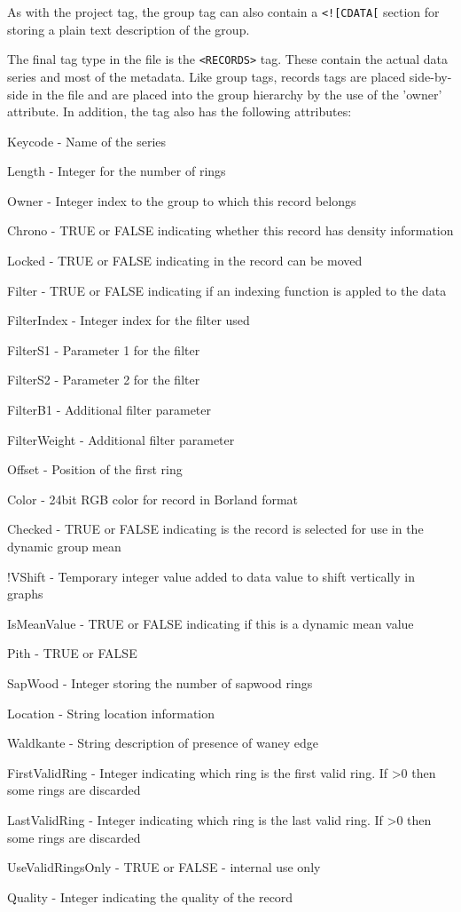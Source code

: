 As with the project tag, the group tag can also contain a \verb|<![CDATA[| section for storing a plain text description of the group.

The final tag type in the file is the \verb|<RECORDS>| tag. These contain the actual data series and most of the metadata. Like group tags, records tags are placed side-by-side in the file and are placed into the group hierarchy by the use of the 'owner' attribute. In addition, the tag also has the following attributes:

\begin{itemize*}
    \item  Keycode - Name of the series
    \item  Length - Integer for the number of rings
    \item  Owner - Integer index to the group to which this record belongs
    \item  Chrono - TRUE or FALSE indicating whether this record has density information
    \item  Locked - TRUE or FALSE indicating in the record can be moved
    \item  Filter - TRUE or FALSE indicating if an indexing function is appled to the data
    \item  FilterIndex - Integer index for the filter used
    \item  FilterS1 - Parameter 1 for the filter
    \item  FilterS2 - Parameter 2 for the filter
    \item  FilterB1 - Additional filter parameter
    \item  FilterWeight - Additional filter parameter
    \item  Offset - Position of the first ring
    \item  Color - 24bit RGB color for record in Borland format
    \item  Checked - TRUE or FALSE indicating is the record is selected for use in the dynamic group mean
    \item  !VShift - Temporary integer value added to data value to shift vertically in graphs
    \item  IsMeanValue - TRUE or FALSE indicating if this is a dynamic mean value
    \item  Pith - TRUE or FALSE
    \item  SapWood - Integer storing the number of sapwood rings
    \item  Location - String location information
    \item  Waldkante - String description of presence of waney edge
    \item  FirstValidRing - Integer indicating which ring is the first valid ring. If >0 then some rings are discarded
    \item  LastValidRing - Integer indicating which ring is the last valid ring. If >0 then some rings are discarded
    \item  UseValidRingsOnly - TRUE or FALSE - internal use only
    \item  Quality - Integer indicating the quality of the record 
\end{itemize*}
